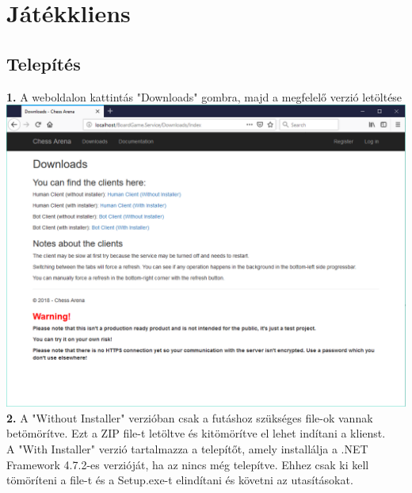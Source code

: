 \documentclass[twoside, a4paper, 12pt]{book}
\begin{document}
\chapter{Játékkliens}
\section{Telepítés}
\noindent \textbf{1.} A weboldalon kattintás "Downloads" gombra, majd a megfelelő verzió letöltése \\
\includegraphics[width=1.0\textwidth]{img/service_downloads.png} \\
\noindent \textbf{2.} A "Without Installer" verzióban csak a futáshoz szükséges file-ok vannak betömörítve. Ezt a ZIP file-t letöltve és kitömörítve el lehet indítani a klienst. \\
A "With Installer" verzió tartalmazza a telepítőt, amely installálja a .NET Framework 4.7.2-es verzióját, ha az nincs még telepítve. Ehhez csak ki kell tömöríteni a file-t és a Setup.exe-t elindítani és követni az utasításokat.
\end{document}
